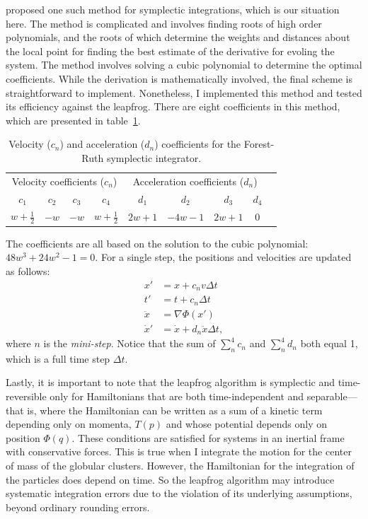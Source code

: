     \citet{1990PhyD...43..105F} proposed one such method for symplectic integrations, which is our situation here. The method is complicated and involves finding roots of high order polynomials, and the roots of which determine the weights and distances about the local point for finding the best estimate of the derivative for evoling the system. The method involves solving a cubic polynomial to determine the optimal coefficients. While the derivation is mathematically involved, the final scheme is straightforward to implement. Nonetheless, I implemented this method and tested its efficiency against the leapfrog. There are eight coefficients in this method, which are presented in table~\ref{tab:forest_ruth_coeffs}.
    \begin{table}[h]
        \centering
        \caption{Velocity (\(c_n\)) and acceleration (\(d_n\)) coefficients for the Forest-Ruth symplectic integrator.}
        \label{tab:forest_ruth_coeffs}
        \begin{tabular}{ccccc|cccc}
            \multicolumn{4}{c|}{Velocity coefficients (\(c_n\))} & \multicolumn{4}{c}{Acceleration coefficients (\(d_n\))} \\
            $c_1$ & $c_2$ & $c_3$ & $c_4$ & $d_1$ & $d_2$ & $d_3$ & $d_4$ \\
            \hline
            $w + \frac{1}{2}$ & $-w$ & $-w$ & $w + \frac{1}{2}$ & $2w + 1$ & $-4w - 1$ & $2w + 1$ & $0$ \\
        \end{tabular}
    \end{table} 
    The coefficients are all based on the solution to the cubic polynomial: $48 w^3 + 24 w^2 - 1 = 0 $. For a single step, the positions and velocities are updated as follows:
    \begin{align} 
        x' &= x + c_n v \Delta t \\ 
        t' &= t + c_n \Delta t \\ 
        \ddot{x} &= \nabla \Phi (x') \\ 
        \dot{x}' &= \dot{x} + d_n \ddot{x} \Delta t,
    \end{align}
    where $n$ is the \textit{mini-step}. Notice that the sum of $\sum_n^4 c_n$ and $\sum_n^4 d_n$ both equal 1, which is a full time step $\Delta t$. 

    Lastly, it is important to note that the leapfrog algorithm is symplectic and time-reversible only for Hamiltonians that are both time-independent and separable—that is, where the Hamiltonian can be written as a sum of a kinetic term depending only on momenta, $T(p)$ and whose potential depends only on position $\Phi(q)$. These conditions are satisfied for systems in an inertial frame with conservative forces. This is true when I integrate the motion for the center of mass of the globular clusters. However, the Hamiltonian for the integration of the particles does depend on time. So the leapfrog algorithm may introduce systematic integration errors due to the violation of its underlying assumptions, beyond ordinary rounding errors.

